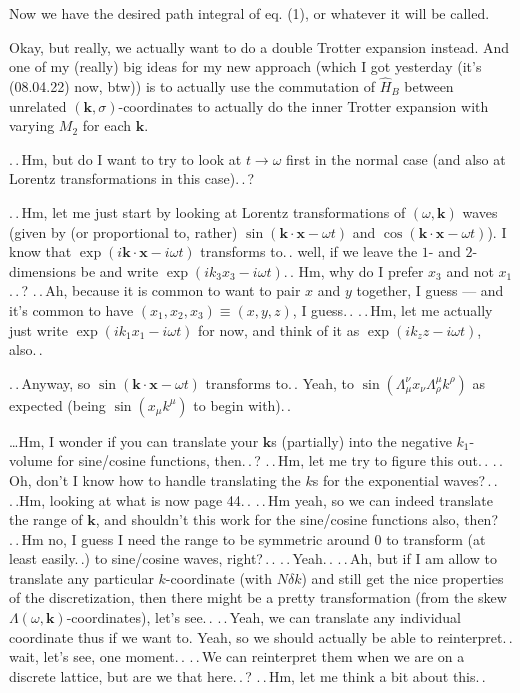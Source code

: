 \documentclass{report}
\begin{document}
Now we have the desired path integral of eq. (1), or whatever it will be called. 

Okay, but really, we actually want to do a double Trotter expansion instead. And one of my (really) big ideas for my new approach (which I got yesterday (it's (08.04.22) now, btw)) is to actually use the commutation of $\hat H_B$ between unrelated $(\boldsymbol{k}, \sigma)$-coordinates to actually do the inner Trotter expansion with varying $M_2$ for each $\boldsymbol{k}$. %

.\,.\,Hm, but do I want to try to look at $t\to \omega$ first in the normal case (and also at Lorentz transformations in this case).\,.\,? 

.\,.\,Hm, let me just start by looking at Lorentz transformations of $(\omega, \boldsymbol{k})$ waves (given by (or proportional to, rather) $\sin(\boldsymbol{k}\cdot \boldsymbol{x} - \omega t)$ and $\cos(\boldsymbol{k}\cdot \boldsymbol{x} - \omega t)$). I know that $\exp(i \boldsymbol{k}\cdot \boldsymbol{x} - i \omega t)$ transforms to.\,. well, if we leave the $1$- and $2$-dimensions be and write $\exp(i k_3 x_3 - i \omega t)$.\,. Hm, why do I prefer $x_3$ and not $x_1$.\,.\,? .\,.\,Ah, because it is common to want to pair $x$ and $y$ together, I guess --- and it's common to have $(x_1, x_2, x_3) \equiv (x, y, z)$, I guess.\,. .\,.\,Hm, let me actually just write $\exp(i k_1 x_1 - i \omega t)$ for now, and think of it as $\exp(i k_z z - i \omega t)$, also.\,. 

.\,.\,Anyway, so $\sin(\boldsymbol{k}\cdot \boldsymbol{x} - \omega t)$ transforms to.\,. Yeah, to $\sin( \Lambda_\mu^\nu x_\nu \Lambda_\rho^\mu k^\rho)$ as expected (being $\sin( x_\mu k^\mu)$ to begin with).\,. 

\ldots Hm, I wonder if you can translate your $\boldsymbol{k}$s (partially) into the negative $k_1$-volume for sine/cosine functions, then.\,.\,? .\,.\,Hm, let me try to figure this out.\,. .\,.\,Oh, don't I know how to handle translating the $k$s for the exponential waves?\,.\,.  .\,.Hm, looking at what is now page 44.\,. .\,.\,Hm yeah, so we can indeed translate the range of $\boldsymbol{k}$, and shouldn't this work for the sine/cosine functions also, then? .\,.\,Hm no, I guess I need the range to be symmetric around 0 to transform (at least easily.\,.) to sine/cosine waves, right?\,.\,. .\,.\,Yeah.\,. .\,.\,Ah, but if I am allow to translate any particular $k$-coordinate (with $N\delta k$) and still get the nice properties of the discretization, then there might be a pretty transformation (from the skew $\Lambda(\omega, \boldsymbol{k})$-coordinates), let's see.\,. %
.\,.\,Yeah, we can translate any individual coordinate thus if we want to. Yeah, so we should actually be able to reinterpret.\,. wait, let's see, one moment.\,. .\,.\,We can reinterpret them when we are on a discrete lattice, but are we that here.\,.\,? .\,.\,Hm, let me think a bit about this.\,. %
\end{document}
